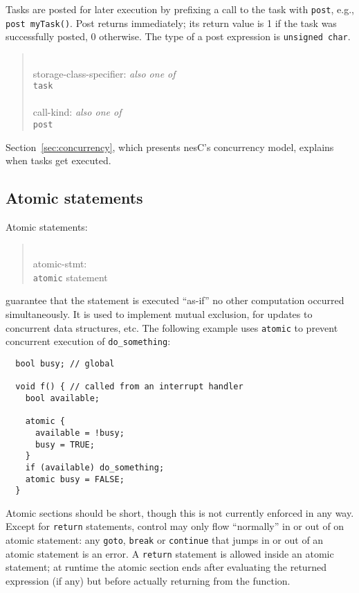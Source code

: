 \documentclass[11pt,letterpaper]{article}
\newcommand{\kw}[1]{{\tt #1}}
\newcommand{\code}[1]{{\tt #1}}
\newcommand{\nesc}{nesC\xspace}
\newcommand{\grammarshift}{\vspace*{-.7cm}}
\newcommand{\grammarindent}{\hspace*{2cm}\= \\ \kill}
\begin{document}
Tasks are posted for later execution by prefixing a call to the task
with \kw{post}, e.g., \code{post myTask()}. Post returns immediately;
its return value is 1 if the task was successfully posted, 0
otherwise. The type of a post expression is \code{unsigned char}.
\begin{quote} \grammarshift \em \begin{tabbing}
\grammarindent
storage-class-specifier: \emph{also one of}\\
\>	\kw{task}\\
\\
call-kind: \emph{also one of}\\
\>	\kw{post}
\end{tabbing} \end{quote}
Section~\ref{sec:concurrency}, which presents \nesc's concurrency
model, explains when tasks get executed.

\subsection{Atomic statements}

Atomic statements:
\begin{quote} \grammarshift \em \begin{tabbing}
\grammarindent
atomic-stmt: \\
\>	\kw{atomic} statement\\
\end{tabbing} \end{quote}
guarantee that the statement is executed ``as-if'' no other computation
occurred simultaneously. It is used to implement mutual exclusion, for
updates to concurrent data structures, etc. The following example
uses \kw{atomic} to prevent concurrent execution of \code{do\_something}:
\begin{verbatim}
  bool busy; // global

  void f() { // called from an interrupt handler
    bool available;

    atomic {
      available = !busy;
      busy = TRUE;
    }
    if (available) do_something;
    atomic busy = FALSE;
  }
\end{verbatim}

Atomic sections should be short, though this is not currently enforced in
any way. Except for \kw{return} statements, control may only flow
``normally'' in or out of on atomic statement: any \kw{goto}, \kw{break} or
\kw{continue} that jumps in or out of an atomic statement is an error. A
\kw{return} statement is allowed inside an atomic statement; at runtime
the atomic section ends after evaluating the returned expression (if any)
but before actually returning from the function.
\end{document}
